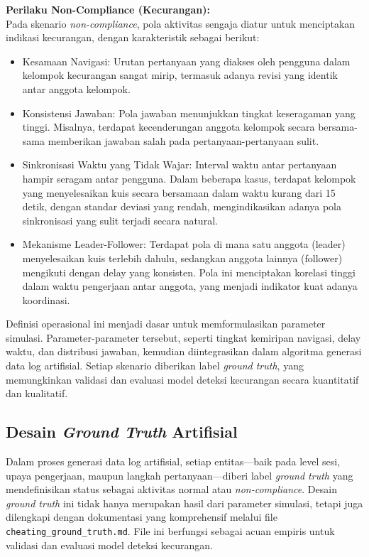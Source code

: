 \textbf{Perilaku Non-Compliance (Kecurangan):} \\
Pada skenario \textit{non-compliance}, pola aktivitas sengaja diatur untuk menciptakan indikasi kecurangan, dengan karakteristik sebagai berikut:
\begin{itemize}
    \item Kesamaan Navigasi: Urutan pertanyaan yang diakses oleh pengguna dalam kelompok kecurangan sangat mirip, termasuk adanya revisi yang identik antar anggota kelompok.
    \item Konsistensi Jawaban: Pola jawaban menunjukkan tingkat keseragaman yang tinggi. Misalnya, terdapat kecenderungan anggota kelompok secara bersama-sama memberikan jawaban salah pada pertanyaan-pertanyaan sulit.
    \item Sinkronisasi Waktu yang Tidak Wajar: Interval waktu antar pertanyaan hampir seragam antar pengguna. Dalam beberapa kasus, terdapat kelompok yang menyelesaikan kuis secara bersamaan dalam waktu kurang dari 15 detik, dengan standar deviasi yang rendah, mengindikasikan adanya pola sinkronisasi yang sulit terjadi secara natural.
    \item Mekanisme Leader-Follower: Terdapat pola di mana satu anggota (leader) menyelesaikan kuis terlebih dahulu, sedangkan anggota lainnya (follower) mengikuti dengan delay yang konsisten. Pola ini menciptakan korelasi tinggi dalam waktu pengerjaan antar anggota, yang menjadi indikator kuat adanya koordinasi.
\end{itemize}

Definisi operasional ini menjadi dasar untuk memformulasikan parameter simulasi. Parameter-parameter tersebut, seperti tingkat kemiripan navigasi, delay waktu, dan distribusi jawaban, kemudian diintegrasikan dalam algoritma generasi data log artifisial. Setiap skenario diberikan label \textit{ground truth}, yang memungkinkan validasi dan evaluasi model deteksi kecurangan secara kuantitatif dan kualitatif.

\subsection{Desain \textit{Ground Truth} Artifisial}
\label{sec:desainGroundTruthArtifisial}
Dalam proses generasi data log artifisial, setiap entitas---baik pada level sesi, upaya pengerjaan, maupun langkah pertanyaan---diberi label \textit{ground truth} yang mendefinisikan status sebagai aktivitas normal atau \textit{non-compliance}. Desain \textit{ground truth} ini tidak hanya merupakan hasil dari parameter simulasi, tetapi juga dilengkapi dengan dokumentasi yang komprehensif melalui file \texttt{cheating\_ground\_truth.md}. File ini berfungsi sebagai acuan empiris untuk validasi dan evaluasi model deteksi kecurangan.

